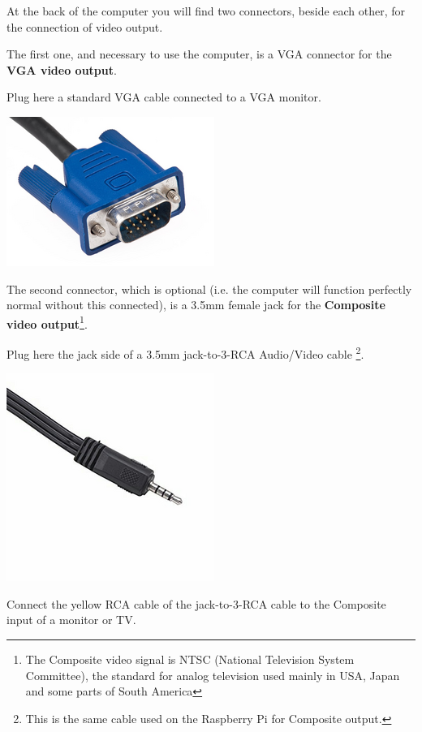         At the back of the computer you will find two connectors, beside each
        other, for the connection of video output.

        The first one, and necessary to use the computer, is a VGA connector for
        the \textbf{VGA video output}.
        
        Plug here a standard VGA cable connected to a VGA monitor.

        \centerline{\includegraphics[scale=0.5]{images/vgaconn.png}}

        The second connector, which is optional (i.e. the computer will function
        perfectly normal without this connected), is a 3.5mm female jack for the
        \textbf{Composite video output}\footnote{The Composite video signal is
        NTSC (National Television System Committee), the standard for analog
        television used mainly in USA, Japan and some parts of South America}.

        Plug here the jack side of a 3.5mm jack-to-3-RCA Audio/Video cable
        \footnote{This is the same cable used on the Raspberry Pi for Composite
        output.}.

        \centerline{\includegraphics[scale=0.5]{images/raspicable_jack.png}}

        Connect the yellow RCA cable of the jack-to-3-RCA cable to the Composite
        input of a monitor or TV.

